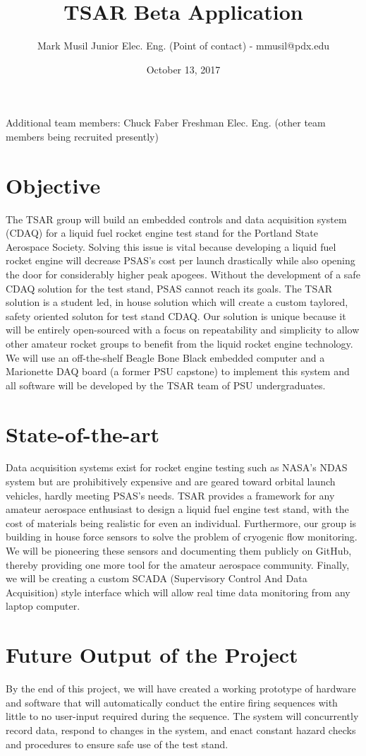 \documentclass{article}
\begin{document}
\author{Mark Musil Junior Elec. Eng. (Point of contact) - mmusil@pdx.edu}
\title{TSAR Beta Application}
\date{October 13, 2017}
\maketitle{}
Additional team members:
Chuck Faber Freshman Elec. Eng. (other team members being recruited presently)
\section{Objective}
The TSAR group will build an embedded controls and data acquisition system (CDAQ) for a liquid fuel rocket engine test stand for the Portland State Aerospace Society. Solving this issue is vital because developing a liquid fuel rocket engine will decrease PSAS’s cost per launch drastically while also opening the door for considerably higher peak apogees. Without the development of a safe CDAQ solution for the test stand, PSAS cannot reach its goals. The TSAR solution is a student led, in house solution which will create a custom taylored, safety oriented soluton for test stand CDAQ. Our solution is unique because it will be entirely open-sourced with a focus on repeatability and simplicity to allow other amateur rocket groups to benefit from the liquid rocket engine technology. We will use an off-the-shelf Beagle Bone Black embedded computer and a Marionette DAQ board (a former PSU capstone) to implement this system and all software will be developed by the TSAR team of PSU undergraduates.
\section{State-of-the-art}
Data acquisition systems exist for rocket engine testing such as NASA’s NDAS system but are prohibitively expensive and are geared toward orbital launch vehicles, hardly meeting PSAS’s needs. TSAR provides a framework for any amateur aerospace enthusiast to design a liquid fuel engine test stand, with the cost of materials being realistic for even an individual. Furthermore, our group is building in house force sensors to solve the problem of cryogenic flow monitoring. We will be pioneering these sensors and documenting them publicly on GitHub, thereby providing one more tool for the amateur aerospace community. Finally, we will be creating a custom SCADA (Supervisory Control And Data Acquisition) style interface which will allow real time data monitoring from any laptop computer. 
\section{Future Output of the Project}
By the end of this project, we will have created a working prototype of hardware and software that will automatically conduct the entire firing sequences with little to no user-input required during the sequence. The system will concurrently record data, respond to changes in the system, and enact constant hazard checks and procedures to ensure safe use of the test stand.
\end{document}
